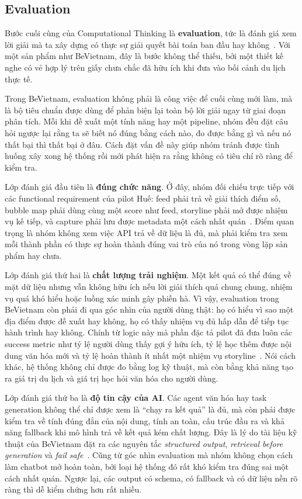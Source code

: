 \subsection{Evaluation}
\contrib

Bước cuối cùng của Computational Thinking là \textbf{evaluation}, tức là
đánh giá xem lời giải mà ta xây dựng có thực sự giải quyết bài toán ban
đầu hay không~\cite{spronck2023}. Với một sản phẩm như BeVietnam, đây là
bước không thể thiếu, bởi một thiết kế nghe có vẻ hợp lý trên giấy chưa
chắc đã hữu ích khi đưa vào bối cảnh du lịch thực tế.

Trong BeVietnam, evaluation không phải là công việc để cuối cùng mới
làm, mà là bộ tiêu chuẩn được dùng để phản biện lại toàn bộ lời giải
ngay từ giai đoạn phân tích. Mỗi khi đề xuất một tính năng hay một
pipeline, nhóm đều đặt câu hỏi ngược lại rằng ta sẽ biết nó đúng bằng
cách nào, đo được bằng gì và nếu nó thất bại thì thất bại ở đâu. Cách
đặt vấn đề này giúp nhóm tránh được tình huống xây xong hệ thống rồi mới
phát hiện ra rằng không có tiêu chí rõ ràng để kiểm tra.

Lớp đánh giá đầu tiên là \textbf{đúng chức năng}. Ở đây, nhóm đối chiếu
trực tiếp với các functional requirement của pilot Huế: feed phải trả về
giải thích điểm số, bubble map phải dùng cùng một score như feed,
storyline phải mở được nhiệm vụ kế tiếp, và capture phải lưu được
metadata một cách nhất quán~\cite{bevietnam_spec}. Điểm quan trọng là
nhóm không xem việc API trả về dữ liệu là đủ, mà phải kiểm tra xem mỗi
thành phần có thực sự hoàn thành đúng vai trò của nó trong vòng lặp sản
phẩm hay chưa.

Lớp đánh giá thứ hai là \textbf{chất lượng trải nghiệm}. Một kết quả có
thể đúng về mặt dữ liệu nhưng vẫn không hữu ích nếu lời giải thích quá
chung chung, nhiệm vụ quá khó hiểu hoặc luồng xác minh gây phiền hà. Vì
vậy, evaluation trong BeVietnam còn phải đi qua góc nhìn của người dùng
thật: họ có hiểu vì sao một địa điểm được đề xuất hay không, họ có thấy
nhiệm vụ đủ hấp dẫn để tiếp tục hành trình hay không. Chính từ logic này
mà phần đặc tả pilot đã đưa luôn các success metric như tỷ lệ người dùng
thấy gợi ý hữu ích, tỷ lệ học thêm được nội dung văn hóa mới và tỷ lệ
hoàn thành ít nhất một nhiệm vụ storyline~\cite{bevietnam_spec}. Nói cách
khác, hệ thống không chỉ được đo bằng log kỹ thuật, mà còn bằng khả năng
tạo ra giá trị du lịch và giá trị học hỏi văn hóa cho người dùng.

Lớp đánh giá thứ ba là \textbf{độ tin cậy của AI}. Các agent văn hóa hay
task generation không thể chỉ được xem là ``chạy ra kết quả'' là đủ, mà
còn phải được kiểm tra về tính đúng đắn của nội dung, tính an toàn, cấu
trúc đầu ra và khả năng fallback khi mô hình trả về kết quả kém chất
lượng. Đây là lý do tài liệu kỹ thuật của BeVietnam đặt ra các nguyên
tắc \textit{structured output}, \textit{retrieval before generation} và
\textit{fail safe}~\cite{bevietnam_spec}. Cũng từ góc nhìn evaluation mà
nhóm không chọn cách làm chatbot mở hoàn toàn, bởi loại hệ thống đó rất
khó kiểm tra đúng sai một cách nhất quán. Ngược lại, các output có
schema, có fallback và có dữ liệu nền rõ ràng thì dễ kiểm chứng hơn rất
nhiều.

